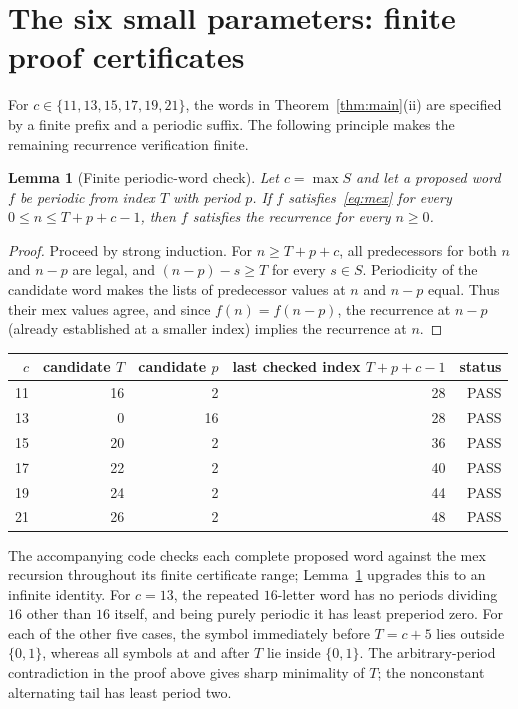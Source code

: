 \documentclass[10pt,a4paper]{article}
\newtheorem{lemma}{Lemma}
\begin{document}
\section{The six small parameters: finite proof certificates}
For $c\in\{11,13,15,17,19,21\}$, the words in Theorem~\ref{thm:main}(ii) are specified by a finite prefix and a periodic suffix. The following principle makes the remaining recurrence verification finite.

\begin{lemma}[Finite periodic-word check]\label{lem:finite}
Let $c=\max S$ and let a proposed word $f$ be periodic from index $T$ with period $p$. If $f$ satisfies~\eqref{eq:mex} for every $0\le n\le T+p+c-1$, then $f$ satisfies the recurrence for every $n\ge0$.
\end{lemma}
\begin{proof}
Proceed by strong induction. For $n\ge T+p+c$, all predecessors for both $n$ and $n-p$ are legal, and $(n-p)-s\ge T$ for every $s\in S$. Periodicity of the candidate word makes the lists of predecessor values at $n$ and $n-p$ equal. Thus their mex values agree, and since $f(n)=f(n-p)$, the recurrence at $n-p$ (already established at a smaller index) implies the recurrence at $n$.
\end{proof}

\begin{center}
\begin{tabular}{rrrrr}
\toprule
$c$ & candidate $T$ & candidate $p$ & last checked index $T+p+c-1$ & status\\
\midrule
11 & 16 & 2 & 28 & PASS\\
13 & 0 & 16 & 28 & PASS\\
15 & 20 & 2 & 36 & PASS\\
17 & 22 & 2 & 40 & PASS\\
19 & 24 & 2 & 44 & PASS\\
21 & 26 & 2 & 48 & PASS\\
\bottomrule
\end{tabular}
\end{center}
The accompanying code checks each complete proposed word against the mex recursion throughout its finite certificate range; Lemma~\ref{lem:finite} upgrades this to an infinite identity. For $c=13$, the repeated $16$-letter word has no periods dividing $16$ other than $16$ itself, and being purely periodic it has least preperiod zero. For each of the other five cases, the symbol immediately before $T=c+5$ lies outside $\{0,1\}$, whereas all symbols at and after $T$ lie inside $\{0,1\}$. The arbitrary-period contradiction in the proof above gives sharp minimality of $T$; the nonconstant alternating tail has least period two.
\end{document}
